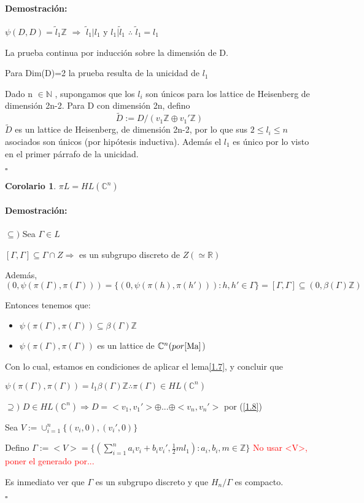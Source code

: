 \documentclass[12pt]{article}
\newtheorem{corollary}{Corolario}
\newenvironment{proof}{\paragraph{Demostración:}}{\hfill$\square$}
\begin{document}
\begin{proof}
$\psi(D,D)=\tilde{l}_1 \mathbb{Z}$ $\Rightarrow$ $\tilde{l}_1 | l_1$ y $l_1 | \tilde{l}_1$ $\therefore$ $\tilde{l}_1=l_1$

La prueba continua por inducción sobre la dimensión de D.

Para Dim(D)=2 la prueba resulta de la unicidad de $l_1$

Dado n $\in \mathbb{N}$ , supongamos que los $l_i$ son únicos para los lattice de Heisenberg de dimensión 2n-2.
Para D con dimensión 2n, defino 
$$\tilde{D}:=D/(v_1 \mathbb{Z} \oplus v_1' \mathbb{Z})$$
$\tilde{D}$ es un lattice de Heisenberg, de dimensión 2n-2, por lo que sus $2\leq l_i\leq n$ asociados son únicos
(por hipótesis inductiva). Además el $l_1$ es único por lo visto en el primer párrafo de la unicidad.

 \end{proof}
 
 \begin{corollary}
  $\pi L = HL(\mathbb{C}^n)$
 \end{corollary}
 \begin{proof}
$\subseteq)$ Sea $\Gamma \in L$

$[\Gamma,\Gamma] \subseteq \Gamma \cap Z \Rightarrow$ es un subgrupo discreto de $Z (\simeq \mathbb{R})$

Además, $(0,\psi(\pi(\Gamma),\pi(\Gamma))) = \{(0,\psi(\pi(h),\pi(h'))): h,h' \in \Gamma\} = [\Gamma,\Gamma] \subseteq (0,\beta(\Gamma) \mathbb{Z})$

Entonces tenemos que:
\begin{itemize}
 \item $\psi(\pi(\Gamma),\pi(\Gamma)) \subseteq \beta(\Gamma) \mathbb{Z}$
 \item $\psi(\pi(\Gamma),\pi(\Gamma))$ es un lattice de $\mathbb{C}^n (por \cite{Ma}$)
\end{itemize}

Con lo cual, estamos en condiciones de aplicar el lema\ref{1.7}, y concluir que 

$\psi(\pi(\Gamma),\pi(\Gamma))=l_1 \beta(\Gamma) \mathbb{Z} \therefore \pi(\Gamma) \in HL(\mathbb{C}^n) $
\newline

$\supseteq)$ $D\in HL(\mathbb{C}^n) \Rightarrow D=<v_1,v_1'>\oplus ... \oplus <v_n,v_n'>$ por (\ref{1.8}) 

Sea  $V:= \cup_{i=1}^n \{(v_i,0),(v_i',0)\}$

Defino $\Gamma := <V>=\{(\sum_{i=1}^n a_i v_i + b_i v_i', \frac{1}{2} m l_1):a_i,b_i,m \in \mathbb{Z} \}$
\newline
\textcolor{red}{No usar <V>, poner el generado por...}

Es inmediato ver que $\Gamma$ es un subgrupo discreto y que $H_n / \Gamma$ es compacto.

 \end{proof}
\end{document}

